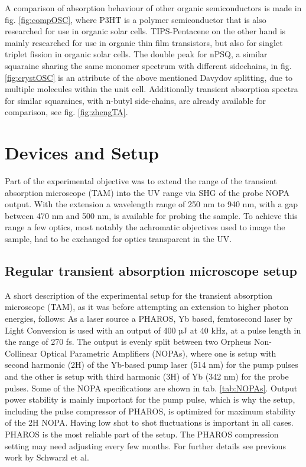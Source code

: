 \documentclass[twoside,openright,listof=numbered]{scrreprt}
\begin{document}
A comparison of absorption behaviour of other organic semiconductors is made in fig. \ref{fig:compOSC}, where P3HT is a polymer semiconductor that is also researched for use in organic solar cells.\cite{Holliday2016} TIPS-Pentacene on the other hand is mainly researched for use in organic thin film transistors, but also for singlet triplet fission in organic solar cells.\cite{Schaberle2020} The double peak for nPSQ, a similar squaraine sharing the same monomer spectrum with different sidechains, in fig. \ref{fig:crystOSC} is an attribute of the above mentioned Davydov splitting, due to multiple molecules within the unit cell.\cite{Balzer2022} Additionally transient absorption spectra for similar squaraines, with n-butyl side-chains, are already available for comparison, see fig. \ref{fig:zhengTA}.\cite{Zheng2020}



\chapter{Devices and Setup}

Part of the experimental objective was to extend the range of the transient absorption microscope (TAM) into the UV range via SHG of the probe NOPA output. With the extension a wavelength range of 250 nm to 940 nm, with a gap between 470 nm and 500 nm, is available for probing the sample. To achieve this range a few optics, most notably the achromatic objectives used to image the sample, had to be exchanged for optics transparent in the UV.
\section{Regular transient absorption microscope setup}\label{RegTAM}
A short description of the experimental setup for the transient absorption microscope (TAM), as it was before attempting an extension to higher photon energies, follows:\newline
As a laser source a PHAROS, Yb based, femtosecond laser by Light Conversion is used with an output of 400 µJ at 40 kHz, at a pulse length in the range of 270 fs. The output is evenly split between two Orpheus Non-Collinear Optical Parametric Amplifiers (NOPAs), where one is setup with second harmonic (2H) of the Yb-based pump laser (514 nm) for the pump pulses and the other is setup with third harmonic (3H) of Yb (342 nm) for the probe pulses. Some of the NOPA specifications are shown in tab. \ref{tab:NOPAs}. Output power stability is mainly important for the pump pulse, which is why the setup, including the pulse compressor of PHAROS, is optimized for maximum stability of the 2H NOPA. Having low shot to shot fluctuations is important in all cases. PHAROS is the most reliable part of the setup. The PHAROS compression setting may need adjusting every few months. For further details see previous work by Schwarzl et al.\cite{Schwarzl2022}\\
\end{document}
